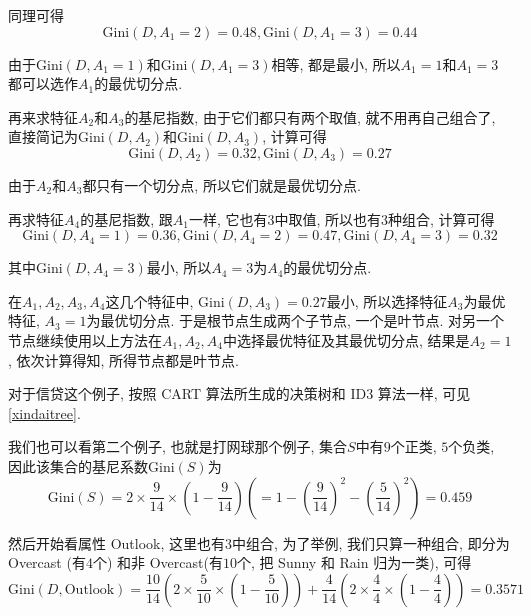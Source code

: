 \documentclass[a4paper,UTF8]{ctexart}
\theoremstyle{plain} \newtheorem{theorem}{定理}[section]
\theoremstyle{plain} \newtheorem{definition}{定义}[section]
\theoremstyle{plain} \newtheorem{lemma}{引理}[section]
\theoremstyle{plain} \newtheorem{proposition}{命题}[section]
\theoremstyle{plain} \newtheorem{example}{例}
\theoremstyle{plain} \newtheorem{remark}{注}
\theoremstyle{plain} \newtheorem{corollary}{推论}[section]
\begin{document}
同理可得
\begin{equation*}
\mathrm{Gini}(D, A_{1} = 2) = 0.48, \mathrm{Gini}(D, A_{1} = 3) = 0.44
\end{equation*}

由于$\mathrm{Gini}(D, A_{1} = 1)$和$\mathrm{Gini}(D, A_{1} = 3)$相等, 都是最小, 所以$A_{1} = 1$和$A_{1} = 3$都可以选作$A_{1}$的最优切分点.

再来求特征$A_{2}$和$A_{3}$的基尼指数, 由于它们都只有两个取值, 就不用再自己组合了, 直接简记为$\mathrm{Gini}(D, A_2)$和$\mathrm{Gini}(D, A_3)$, 计算可得
\begin{equation*}
\mathrm{Gini}(D, A_2) = 0.32, \mathrm{Gini}(D, A_3) = 0.27
\end{equation*}

由于$A_2$和$A_3$都只有一个切分点, 所以它们就是最优切分点.

再求特征$A_4$的基尼指数, 跟$A_{1}$一样, 它也有$3$中取值, 所以也有$3$种组合, 计算可得
\begin{equation*}
\mathrm{Gini}(D, A_{4} = 1) = 0.36, \mathrm{Gini}(D, A_{4} = 2) = 0.47, \mathrm{Gini}(D, A_{4} = 3) = 0.32
\end{equation*}

其中$\mathrm{Gini}(D, A_{4} = 3)$最小, 所以$A_{4} = 3$为$A_4$的最优切分点.

在$A_1, A_2, A_3, A_4$这几个特征中, $\mathrm{Gini}(D, A_{3}) = 0.27$最小, 所以选择特征$A_{3}$为最优特征, $A_{3} = 1$为最优切分点. 于是根节点生成两个子节点, 一个是叶节点. 对另一个节点继续使用以上方法在$A_1, A_2, A_4$中选择最优特征及其最优切分点, 结果是$A_{2} = 1$, 依次计算得知, 所得节点都是叶节点.

对于信贷这个例子, 按照 CART 算法所生成的决策树和 ID3 算法一样, 可见\ref{xindaitree}.

我们也可以看第二个例子, 也就是打网球那个例子, 集合$S$中有$9$个正类, $5$个负类, 因此该集合的基尼系数$\mathrm{Gini}(S)$为
\begin{equation*}
\mathrm{Gini}(S) = 2 \times \frac{9}{14} \times \left( 1 - \frac{9}{14} \right) \left( = 1 - \left( \frac{9}{14} \right)^2 - \left( \frac{5}{14} \right)^2 \right) = 0.459
\end{equation*}

然后开始看属性 Outlook, 这里也有$3$中组合, 为了举例, 我们只算一种组合, 即分为 Overcast (有$4$个) 和非 Overcast(有$10$个, 把 Sunny 和 Rain 归为一类), 可得
\begin{equation*}
\mathrm{Gini}(D, \mathrm{Outlook}) = \frac{10}{14} \left( 2 \times \frac{5}{10} \times \left( 1 - \frac{5}{10} \right) \right) + \frac{4}{14} \left( 2 \times \frac{4}{4} \times \left( 1 - \frac{4}{4} \right) \right) = 0.3571
\end{equation*}
\end{document}
